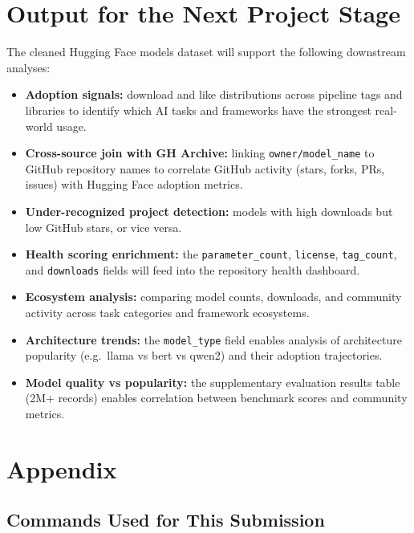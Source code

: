 \documentclass[11pt]{article}
\begin{document}
\section{Output for the Next Project Stage}

The cleaned Hugging Face models dataset will support the following downstream analyses:

\begin{itemize}
  \item \textbf{Adoption signals:} download and like distributions across pipeline tags and libraries to identify which AI tasks and frameworks have the strongest real-world usage.
  \item \textbf{Cross-source join with GH Archive:} linking \texttt{owner/model\_name} to GitHub repository names to correlate GitHub activity (stars, forks, PRs, issues) with Hugging Face adoption metrics.
  \item \textbf{Under-recognized project detection:} models with high downloads but low GitHub stars, or vice versa.
  \item \textbf{Health scoring enrichment:} the \texttt{parameter\_count}, \texttt{license}, \texttt{tag\_count}, and \texttt{downloads} fields will feed into the repository health dashboard.
  \item \textbf{Ecosystem analysis:} comparing model counts, downloads, and community activity across task categories and framework ecosystems.
  \item \textbf{Architecture trends:} the \texttt{model\_type} field enables analysis of architecture popularity (e.g.\ llama vs bert vs qwen2) and their adoption trajectories.
  \item \textbf{Model quality vs popularity:} the supplementary evaluation results table (2M+ records) enables correlation between benchmark scores and community metrics.
\end{itemize}

\section{Appendix}

\subsection{Commands Used for This Submission}
\end{document}
